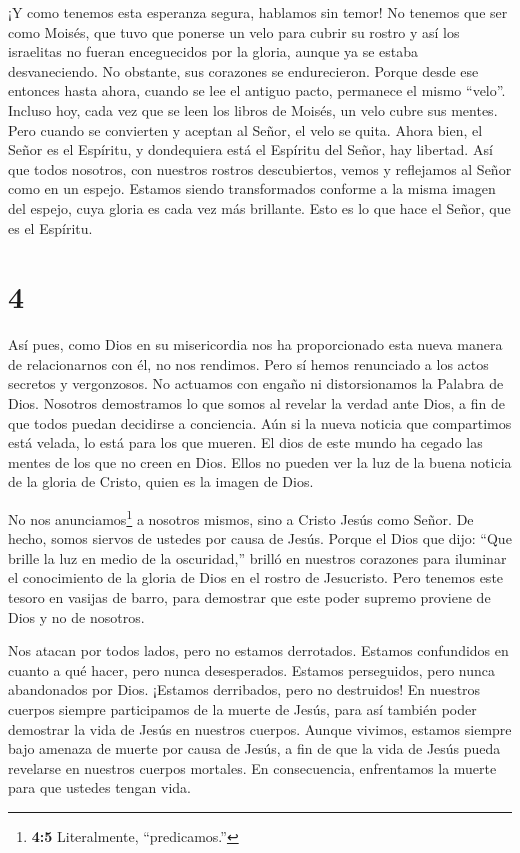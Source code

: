  ¡Y como tenemos esta esperanza segura, hablamos sin temor!
 No tenemos que ser como Moisés, que tuvo que ponerse un
velo para cubrir su rostro y así los israelitas no fueran enceguecidos
por la gloria, aunque ya se estaba desvaneciendo.  No
obstante, sus corazones se endurecieron. Porque desde ese entonces hasta
ahora, cuando se lee el antiguo pacto, permanece el mismo ``velo''.
 Incluso hoy, cada vez que se leen los libros de Moisés, un
velo cubre sus mentes.  Pero cuando se convierten y aceptan
al Señor, el velo se quita.  Ahora bien, el Señor es el
Espíritu, y dondequiera está el Espíritu del Señor, hay libertad.
 Así que todos nosotros, con nuestros rostros descubiertos,
vemos y reflejamos al Señor como en un espejo. Estamos siendo
transformados conforme a la misma imagen del espejo, cuya gloria es cada
vez más brillante. Esto es lo que hace el Señor, que es el Espíritu.

\hypertarget{section-3}{%
\section{4}\label{section-3}}

 Así pues, como Dios en su misericordia nos ha proporcionado
esta nueva manera de relacionarnos con él, no nos rendimos. 
Pero sí hemos renunciado a los actos secretos y vergonzosos. No actuamos
con engaño ni distorsionamos la Palabra de Dios. Nosotros demostramos lo
que somos al revelar la verdad ante Dios, a fin de que todos puedan
decidirse a conciencia.  Aún si la nueva noticia que
compartimos está velada, lo está para los que mueren.  El
dios de este mundo ha cegado las mentes de los que no creen en Dios.
Ellos no pueden ver la luz de la buena noticia de la gloria de Cristo,
quien es la imagen de Dios.

 No nos anunciamos\footnote{\textbf{4:5} Literalmente,
  ``predicamos.''} a nosotros mismos, sino a Cristo Jesús como Señor. De
hecho, somos siervos de ustedes por causa de Jesús.  Porque
el Dios que dijo: ``Que brille la luz en medio de la oscuridad,'' brilló
en nuestros corazones para iluminar el conocimiento de la gloria de Dios
en el rostro de Jesucristo.  Pero tenemos este tesoro en
vasijas de barro, para demostrar que este poder supremo proviene de Dios
y no de nosotros.

 Nos atacan por todos lados, pero no estamos derrotados.
Estamos confundidos en cuanto a qué hacer, pero nunca desesperados.
 Estamos perseguidos, pero nunca abandonados por Dios.
¡Estamos derribados, pero no destruidos!  En nuestros
cuerpos siempre participamos de la muerte de Jesús, para así también
poder demostrar la vida de Jesús en nuestros cuerpos. 
Aunque vivimos, estamos siempre bajo amenaza de muerte por causa de
Jesús, a fin de que la vida de Jesús pueda revelarse en nuestros cuerpos
mortales.  En consecuencia, enfrentamos la muerte para que
ustedes tengan vida.

